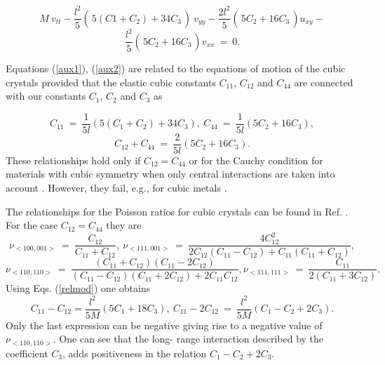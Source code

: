 \[
M~v_{tt}-\frac{l^2}{5}\left(\frac{}{}5(C1+C_2)+34 C_3\frac{}{}\right)~v_{yy}-\frac{2l^2}{5}\left(\frac{}{}5C_2+16 C_3\frac{}{}\right)u_{xy}-
\]
\begin{equation}
	\frac{l^2}{5}\left(\frac{}{}5C_2+16 C_3\frac{}{}\right) v_{xx}~=~0.
	\label{aux2}
\end{equation}

Equations (\ref{aux1}), (\ref{aux2}) are related to the equations of motion of the cubic crystals provided that the elastic cubic constants $C_{11}$, $C_{12}$ and $C_{44}$ are connected with our constants $C_1$, $C_2$ and $C_3$ as

\[
C_{11}~=~\frac{1}{5l}\left(5(C_1+C_2)+34 C_3\right),~ C_{44}~=~\frac{1}{5l}\left(5C_2+16 C_3\right),
\]
\begin{equation}
	C_{12}+C_{44}~=~\frac{2}{5 l}\left( 5 C_2+16 C_3\right). \label{relmod}
\end{equation}
These relationships hold only if $C_{12}=C_{44}$ or for the Cauchy condition  for materials with cubic symmetry when only central interactions are taken into account \cite{Born}. However, they fail, e.g., for cubic metals \cite{thomas_cauchy}.

The relationships for the Poisson ratios for cubic crystals can be found in Ref. \cite{erof_pav}. For the case $C_{12}=C_{44}$ they are
\[
\nu_{<100,001>}~=~\frac{C_{12}}{C_{11}+C_{12}},~\nu_{<111,001>}~=~\frac{4 C_{12}^2}{2C_{12}(C_{11}-C_{12})+C_{11}(C_{11}+C_{12})},
\]
\[
\nu_{<110,110>}~=~\frac{(C_{11}+C_{12})(C_{11}-2 C_{12})}{(C_{11}-C_{12})(C_{11}+2C_{12})+2C_{11} C_{12}},\nu_{<111,111>}~=~\frac{C_{11}}{2(C_{11}+3C_{12})}.
\]
Using Eqs. (\ref{relmod}) one obtains
\[
C_{11}-C_{12}=\frac{l^2}{5 M}\left( 5C_1+18 C_3\right), ~C_{11}-2C_{12}~=~\frac{l^2}{5M}\left(C_1 - C_2 + 2 C_3\right).
\]
Only the last expression can be negative giving rise to a negative value of $\nu_{<110,110>}$. One can see that the long- range interaction described by the coefficient $C_3$, adds positiveness in the relation $C_1 - C_2 + 2 C_3$.



